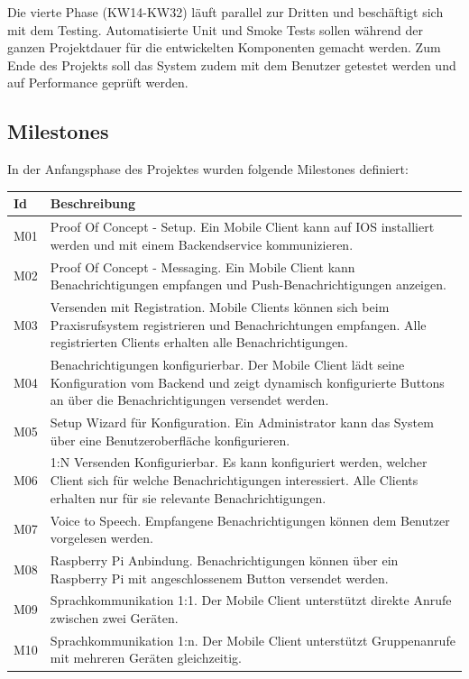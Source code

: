 Die vierte Phase (KW14-KW32) läuft parallel zur Dritten und beschäftigt sich mit dem Testing.
Automatisierte Unit und Smoke Tests sollen während der ganzen Projektdauer für die entwickelten Komponenten gemacht werden.
Zum Ende des Projekts soll das System zudem mit dem Benutzer getestet werden und auf Performance geprüft werden.

\clearpage
\subsection{Milestones}

In der Anfangsphase des Projektes wurden folgende Milestones definiert:

\begin{table}[h]
    \centering
    \begin{tabular}{|l|p{15cm}|}
        \hline
        \textbf{Id} & \textbf{Beschreibung}                                                                                                                                                                                         \\
        \hline
        M01         & Proof Of Concept - Setup. Ein Mobile Client kann auf IOS installiert werden und mit einem Backendservice kommunizieren. \\
        \hline
        M02         & Proof Of Concept - Messaging. Ein Mobile Client kann Benachrichtigungen empfangen und Push-Benachrichtigungen anzeigen. \\
        \hline
        M03         & Versenden mit Registration. Mobile Clients können sich beim Praxisrufsystem registrieren und Benachrichtungen empfangen. Alle registrierten Clients erhalten alle Benachrichtigungen. \\
        \hline
        M04         & Benachrichtigungen konfigurierbar. Der Mobile Client lädt seine Konfiguration vom Backend und zeigt dynamisch konfigurierte Buttons an über die Benachrichtigungen versendet werden.\\
        \hline
        M05         & Setup Wizard für Konfiguration. Ein Administrator kann das System über eine Benutzeroberfläche konfigurieren.  \\
        \hline
        M06         & 1:N Versenden Konfigurierbar. Es kann konfiguriert werden, welcher Client sich für welche Benachrichtigungen interessiert. Alle Clients erhalten nur für sie relevante Benachrichtigungen.  \\
        \hline
        M07         & Voice to Speech. Empfangene Benachrichtigungen können dem Benutzer vorgelesen werden. \\
        \hline
        M08         & Raspberry Pi Anbindung. Benachrichtigungen können über ein Raspberry Pi mit angeschlossenem Button versendet werden. \\
        \hline
        M09         & Sprachkommunikation 1:1. Der Mobile Client unterstützt direkte Anrufe zwischen zwei Geräten. \\
        \hline
        M10         & Sprachkommunikation 1:n. Der Mobile Client unterstützt Gruppenanrufe mit mehreren Geräten gleichzeitig. \\
        \hline
    \end{tabular}\label{tab:milestones}
\end{table}
\clearpage


